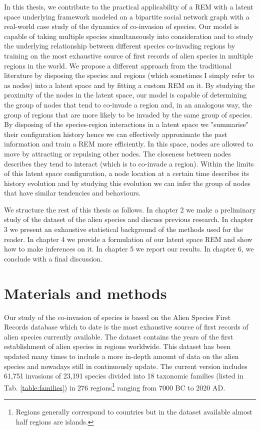 \documentclass[mscthesis]{usiinfthesis}
\begin{document}


In this thesis, we contribute to the practical applicability of a REM with a latent space underlying framework modeled on a bipartite social network graph with a real-world case study of the dynamics of co-invasion of species. Our model is capable of taking multiple species simultaneously into consideration and to study the underlying relationship between different species co-invading regions by training on the most exhaustive source of first records of alien species in multiple regions in the world. We propose a different approach from the traditional literature by disposing the species and regions (which sometimes I simply refer to as nodes) into a latent space and by fitting a custom REM on it. By studying the proximity of the nodes in the latent space, our model is capable of determining the group of nodes that tend to co-invade a region and, in an analogous way, the group of regions that are more likely to be invaded by the same group of species.  By disposing of the species-region interactions in a latent space we "summarise" their configuration history hence we can effectively approximate the past information and train a REM more efficiently. In this space, nodes are allowed to move by attracting or repulsing other nodes. The closeness between nodes describes they tend to interact (which is to co-invade a region). Within the limits of this latent space configuration, a node location at a certain time describes its history evolution and by studying this evolution we can infer the group of nodes that have similar tendencies and behaviours.


We structure the rest of this thesis as follows. In chapter 2 we make a preliminary study of the dataset of the alien species and discuss previous research. In chapter 3 we present an exhaustive statistical background of the methods used for the reader. In chapter 4 we provide a formulation of our latent space REM and show how to make inferences on it. In chapter 5 we report our results. In chapter 6, we conclude with a final discussion.



\chapter{Materials and methods}
\label{sec:dataset}
Our study of the co-invasion of species is based on the Alien Species First Records database \cite{intro:dataset} which to date is the most exhaustive source of first records of alien species currently available. The dataset contains the years of the first establishment of alien species in regions worldwide. This dataset has been updated many times to include a more in-depth amount of data on the alien species \cite{intro:datasetv2} and nowadays still in continuously update. The current version includes 61,751 invasions of 23,191 species divided into 18 taxonomic families (listed in Tab. \ref{table:families}) in 276 regions\footnote{Regions generally correspond to countries but in the dataset available almost half regions are islands.} ranging from 7000 BC to 2020 AD.
\end{document}
